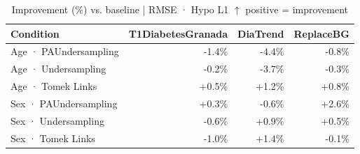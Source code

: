 \begin{table}[htbp]
\centering
\small
\caption{Improvement (\%) vs. baseline  |  RMSE · Hypo L1  $\uparrow$ positive = improvement}
\label{tab:delta_rmse_tbr_1_family_size_undersampling}
\begin{tabular}{lrrr}
\toprule
\textbf{Condition} & \textbf{T1DiabetesGranada} & \textbf{DiaTrend} & \textbf{ReplaceBG} \\
\midrule
Age · PAUndersampling & \textcolor{BrickRed}{-1.4\%} & \textcolor{BrickRed}{-4.4\%} & \textcolor{BrickRed}{-0.8\%} \\
Age · Undersampling & \textcolor{BrickRed}{-0.2\%} & \textcolor{BrickRed}{-3.7\%} & \textcolor{BrickRed}{-0.3\%} \\
Age · Tomek Links & \textcolor{OliveGreen}{+0.5\%} & \textcolor{OliveGreen}{+1.2\%} & \textcolor{OliveGreen}{+0.8\%} \\
\midrule
Sex · PAUndersampling & \textcolor{OliveGreen}{+0.3\%} & \textcolor{BrickRed}{-0.6\%} & \textcolor{OliveGreen}{+2.6\%} \\
Sex · Undersampling & \textcolor{BrickRed}{-0.6\%} & \textcolor{OliveGreen}{+0.9\%} & \textcolor{OliveGreen}{+0.5\%} \\
Sex · Tomek Links & \textcolor{BrickRed}{-1.0\%} & \textcolor{OliveGreen}{+1.4\%} & \textcolor{BrickRed}{-0.1\%} \\
\bottomrule
\end{tabular}
\end{table}